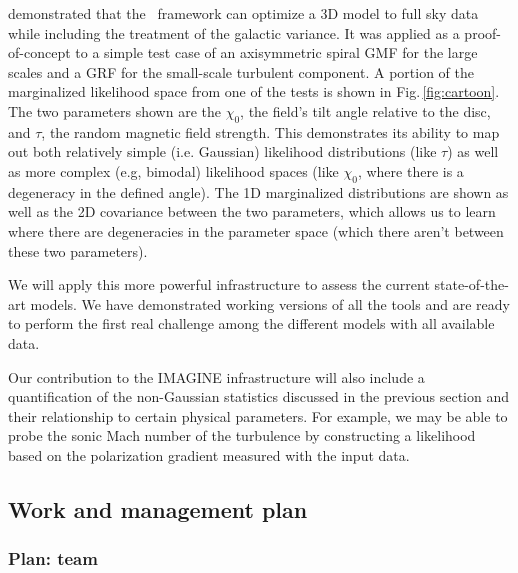 \citet{steininger:2018} demonstrated that the \imagineSW\ framework can optimize a 3D model to full sky data while including the treatment of the galactic variance.  It was applied as a proof-of-concept to a simple test case of an axisymmetric spiral GMF for the large scales and a GRF for the small-scale turbulent component. A portion of the marginalized likelihood space from one of the tests is shown in Fig.\,\ref{fig:cartoon}.  The two parameters shown are the $\chi_0$, the field's tilt angle relative to the disc, and $\tau$, the random magnetic field strength.  This demonstrates its ability to map out both relatively simple (i.e. Gaussian) likelihood distributions (like $\tau$) as well as more complex (e.g, bimodal) likelihood spaces (like $\chi_0$, where there is a degeneracy in the defined angle). The 1D marginalized distributions are shown as well as the 2D covariance between the two parameters, which allows us to learn where there are degeneracies in the parameter space (which there aren't between these two parameters).

We will apply this more powerful infrastructure to assess the current state-of-the-art models. We have demonstrated working versions of all the tools and are ready to perform the first real challenge among the different models with all available data.

Our contribution to the IMAGINE infrastructure will also include a quantification of the non-Gaussian statistics discussed in the previous section and their relationship to certain physical parameters.  For example, we may be able to probe the sonic Mach number of the turbulence by constructing a likelihood based on the polarization gradient measured with the input data.  


\subsection*{Work and management plan}


\subsubsection*{Plan:  team}

